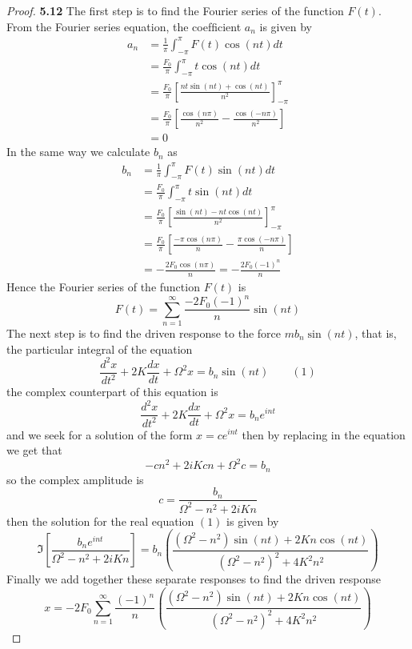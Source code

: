 \documentclass[11pt]{article}
\theoremstyle{definition}
\begin{document}
    \begin{proof}{\textbf{5.12}}
        The ﬁrst step is to ﬁnd the Fourier series of the function $F(t)$. From
        the Fourier series equation, the coefﬁcient $a_n$ is given by
        \begin{align*}
            a_n &= \frac{1}{\pi}\int_{-\pi}^{\pi} F(t) \cos(nt)dt\\
                &= \frac{F_0}{\pi}\int_{-\pi}^{\pi} t\cos(nt)dt \\
                &= \frac{F_0}{\pi}\left[\frac{nt\sin(nt)+\cos(nt)}{n^2}\right]_{-\pi}^{\pi} \\
                &= \frac{F_0}{\pi}\left[\frac{\cos(n\pi)}{n^2} - \frac{\cos(-n\pi)}{n^2}\right] \\
                &= 0
        \end{align*}
        In the same way we calculate $b_n$ as
        \begin{align*}
            b_n &= \frac{1}{\pi}\int_{-\pi}^{\pi} F(t) \sin(nt)dt\\
                &= \frac{F_0}{\pi}\int_{-\pi}^{\pi} t\sin(nt)dt \\
                &= \frac{F_0}{\pi}\left[\frac{\sin(nt)-nt\cos(nt)}{n^2}\right]_{-\pi}^{\pi} \\
                &= \frac{F_0}{\pi}\left[\frac{-\pi\cos(n\pi)}{n} - \frac{\pi\cos(-n\pi)}{n}\right] \\
                &= -\frac{2F_0\cos(n\pi)}{n} = -\frac{2F_0(-1)^n}{n}
        \end{align*}
        Hence the Fourier series of the function $F(t)$ is
        $$F(t) = \sum^{\infty}_{n=1}\frac{-2F_0(-1)^n}{n} \sin(nt)$$
        The next step is to ﬁnd the driven response to the force
        $mb_n\sin(nt)$, that is, the particular integral of the equation
        $$\frac{d^2x}{dt^2} + 2K\frac{dx}{dt} + \Omega^2x = b_n\sin(nt) \quad\quad (1)$$
        the complex counterpart of this equation is
        $$\frac{d^2x}{dt^2} + 2K\frac{dx}{dt} + \Omega^2x = b_ne^{int}$$
        and we seek for a solution of the form $x = ce^{int}$ then by replacing
        in the equation we get that
        $$-cn^2 + 2iKcn + \Omega^2c = b_n$$
        so the complex amplitude is 
        $$c = \frac{b_n}{\Omega^2 - n^2 + 2iKn}$$
        then the solution for the real equation $(1)$ is given by
        $$\Im\left[\frac{b_ne^{int}}{\Omega^2 - n^2 + 2iKn}\right] = 
            b_n\left(\frac{(\Omega^2-n^2)\sin(nt) + 2Kn\cos(nt)}{(\Omega^2-n^2)^2+4K^2n^2}\right)$$
        Finally we add together these separate responses to ﬁnd the driven response
        $$x = -2F_0\sum_{n=1}^{\infty}\frac{(-1)^n}{n}\left(\frac{(\Omega^2-n^2)\sin(nt) + 2Kn\cos(nt)}{(\Omega^2-n^2)^2+4K^2n^2}\right)$$
    \end{proof}
\end{document}
